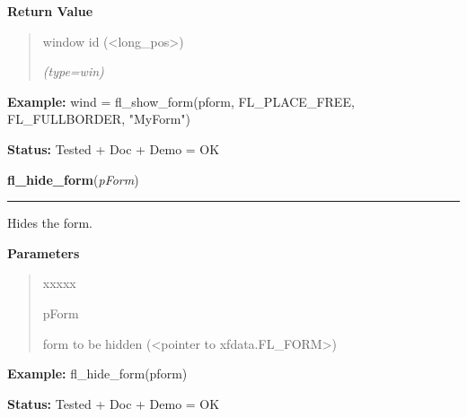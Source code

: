 \begin{boxedminipage}{\funcwidth}
\begin{quote}
      \end{quote}

      \textbf{Return Value}
    \vspace{-1ex}

      \begin{quote}
      window id ({\textless}long\_pos{\textgreater})

      {\it (type=win)}

      \end{quote}

\textbf{Example:} wind = fl\_show\_form(pform, FL\_PLACE\_FREE, FL\_FULLBORDER, "MyForm")



\textbf{Status:} Tested + Doc + Demo = OK



    \end{boxedminipage}

    \label{xformslib:library:fl_hide_form}

    \vspace{0.5ex}

\hspace{.8\funcindent}\begin{boxedminipage}{\funcwidth}

    \raggedright \textbf{fl\_hide\_form}(\textit{pForm})

    \vspace{-1.5ex}

    \rule{\textwidth}{0.5\fboxrule}
\setlength{\parskip}{2ex}
    Hides the form.

\setlength{\parskip}{1ex}
      \textbf{Parameters}
      \vspace{-1ex}

      \begin{quote}
        \begin{Ventry}{xxxxx}

          \item[pForm]

          form to be hidden ({\textless}pointer to 
          xfdata.FL\_FORM{\textgreater})

        \end{Ventry}

      \end{quote}

\textbf{Example:} fl\_hide\_form(pform)



\textbf{Status:} Tested + Doc + Demo = OK



    \end{boxedminipage}

